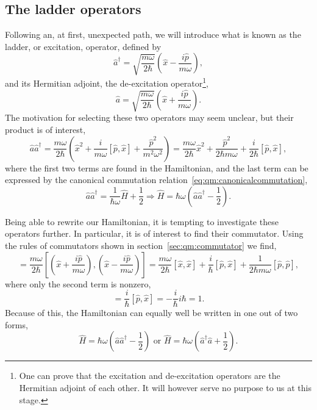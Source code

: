 \subsection{The ladder operators}
\label{sec:qm:ladder}
Following an, at first, unexpected path, we will introduce what is known as the ladder, or excitation, operator, defined by
\begin{equation}
\hat{a}^{\dagger} = \sqrt{\frac{m\omega}{2\hbar}} \left(\hat{x} - \frac{i\hat{p}}{m\omega} \right) ,
\end{equation}
and its Hermitian adjoint, the de-excitation operator\footnote{One can prove that the excitation and de-excitation operators are the Hermitian adjoint of each other. It will however serve no purpose to us at this stage.},
\begin{equation}
\hat{a} = \sqrt{\frac{m\omega}{2\hbar}} \left(\hat{x} + \frac{i\hat{p}}{m\omega} \right) .
\end{equation}
The motivation for selecting these two operators may seem unclear, but their product is of interest,
\begin{equation}
\hat{a}\hat{a}^{\dagger} = 
\frac{m\omega}{2\hbar} \left(\hat{x}^2 + \frac{i}{m\omega}[\hat{p},\hat{x}] + \frac{\hat{p}^2}{m^2 \omega^2} \right) =
\frac{m\omega}{2\hbar} \hat{x}^2 + \frac{\hat{p}^2}{2\hbar m \omega} + \frac{i}{2\hbar} [\hat{p},\hat{x}] ,
\end{equation}
where the first two terms are found in the Hamiltonian, and the last term can be expressed by the canonical commutation relation~\eqref{eq:qm:canonicalcommutation},
\begin{equation}
\hat{a}\hat{a}^{\dagger} = 
\frac{1}{\hbar \omega} \hat{H} + \frac{1}{2} \Rightarrow
\hat{H} = \hbar \omega \left( \hat{a}\hat{a}^{\dagger} - \frac{1}{2} \right) .
\end{equation}

Being able to rewrite our Hamiltonian, it is tempting to investigate these operators further. In particular, it is of interest to find their commutator.
Using the rules of commutators shown in section~\ref{sec:qm:commutator} we find,
\begin{equation}
[\hat{a},\hat{a}^{\dagger}] = 
\frac{m \omega}{2\hbar} \left[\left( \hat{x} + \frac{i\hat{p}}{m \omega} \right), \left(\hat{x} - \frac{i\hat{p}}{m \omega} \right) \right] =
\frac{m \omega}{2\hbar}  [\hat{x},\hat{x}] + \frac{i}{\hbar}[\hat{p},\hat{x}] + \frac{1}{2\hbar m\omega} [\hat{p},\hat{p}] ,
\end{equation}
where only the second term is nonzero,
\begin{equation}
[\hat{a},\hat{a}^{\dagger}] = 
\frac{i}{\hbar}[\hat{p},\hat{x}] = 
-\frac{i}{\hbar} i \hbar =
1 .
\end{equation}
Because of this, the Hamiltonian can equally well be written in one out of two forms,
\begin{equation}
\label{eq:qm:hohamiltonian}
\hat{H} = \hbar \omega \left( \hat{a}\hat{a}^{\dagger} - \frac{1}{2} \right)
\textrm{ or }
\hat{H} = \hbar \omega \left( \hat{a}^{\dagger}\hat{a} + \frac{1}{2} \right).
\end{equation}

